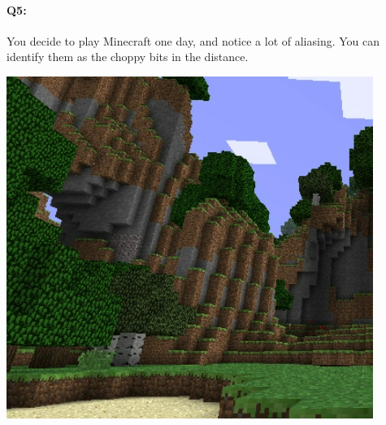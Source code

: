 




\pagebreak
\paragraph{Q5:} You decide to play Minecraft one day, and notice a lot of aliasing. You can identify them as the choppy bits in the distance.

\includegraphics[width=\linewidth]{images/aliased-minecraft.png}




